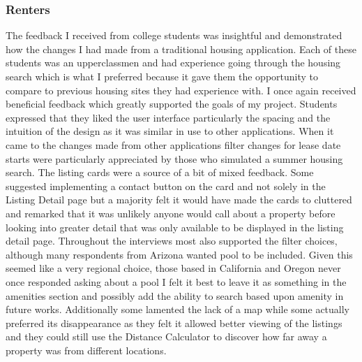 \documentclass[10pt,twocolumn]{article}
\begin{document}
\subsubsection{Renters}
The feedback I received from college students was insightful and demonstrated how the changes I had made from a traditional housing application. Each of these students was an upperclassmen and had experience going through the housing search which is what I preferred because it gave them the opportunity to compare to previous housing sites they had experience with. I once again received beneficial feedback which greatly supported the goals of my project. Students expressed that they liked the user interface particularly the spacing and the intuition of the design as it was similar in use to other applications. When it came to the changes made from other applications filter changes for lease date starts were particularly appreciated by those who simulated a summer housing search. The listing cards were a source of a bit of mixed feedback. Some suggested implementing a contact button on the card and not solely in the Listing Detail page but a majority felt it would have made the cards to cluttered and remarked that it was unlikely anyone would call about a property before looking into greater detail that was only available to be displayed in the listing detail page. Throughout the interviews most also supported  the filter choices, although many respondents from Arizona wanted pool to be included. Given this seemed like a very regional choice, those based in California and Oregon never once responded asking about a pool I felt it best to leave it as something in the amenities section and possibly add the ability to search based upon amenity in future works. Additionally some lamented the lack of a map while some actually preferred its disappearance as they felt it allowed better viewing of the listings and they could still use the Distance Calculator to discover how far away a property was from different locations.  
\end{document}
